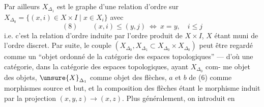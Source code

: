 Par ailleurs $X_{\Delta_1}$ est le graphe d'une relation
d'ordre sur $X_{\Delta_0}=\{(x,i)\in X\times I\mid x\in X_i\}$
avec
\[
(8)\qquad (x,i)\leq(y,j)\ \Longleftrightarrow\ x=y,\quad i\leq j
\]
i.e. c'est la relation d'ordre induite par
l'ordre produit de $X\times I$, $X$ étant  muni
de l'ordre discret. Par suite, le
couple $(X_{\Delta_0},X_{\Delta_1}\subset X_{\Delta_0}\times X_{\Delta_0})$ peut
être regardé comme un ``objet ordonné de
la catégorie des espaces topologiques'' ---
d'où une catégorie, dans la catégorie
des espaces topologiques, ayant $X_{\Delta_0}$ com-
me objet des objets, $\unsure{X}_{\Delta_1}$ comme objet
des flèches, $a$ et $b$ de (6) comme
morphismes source et but, et la
composition des flèches étant le
morphisme
induit par la projection $(x,y,z)\longrightarrow(x,z)$.
Plus généralement, on introduit en
